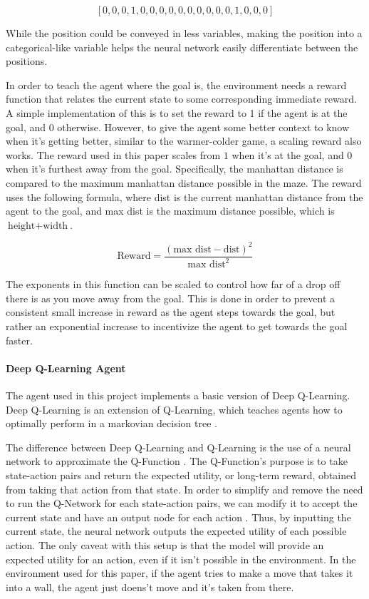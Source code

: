 \documentclass[12pt]{article}
\begin{document}
$$\left[0,0,0,1,0,0,0,0,0,0,0,0,0,0,1,0,0,0\right]$$

While the position could be conveyed in less variables, making the position into a categorical-like variable helps the neural network easily differentiate between the positions.

In order to teach the agent where the goal is, the environment needs a reward function that relates the current state to some corresponding immediate reward.
A simple implementation of this is to set the reward to 1 if the agent is at the goal, and 0 otherwise.
However, to give the agent some better context to know when it's getting better, similar to the warmer-colder game, a scaling reward also works.
The reward used in this paper scales from $1$ when it's at the goal, and $0$ when it's furthest away from the goal.
Specifically, the manhattan distance is compared to the maximum manhattan distance possible in the maze.
The reward uses the following formula, where dist is the current manhattan distance from the agent to the goal, and max dist is the maximum distance possible, which is $\text{height} + \text{width}$.

$$\text{Reward} = \frac{(\text{max dist} - \text{dist}) ^ 2}{\text{max dist}^2}$$

The exponents in this function can be scaled to control how far of a drop off there is as you move away from the goal.
This is done in order to prevent a consistent small increase in reward as the agent steps towards the goal, but rather an exponential increase to incentivize the agent to get towards the goal faster.

\paragraph{Deep Q-Learning Agent}

The agent used in this project implements a basic version of Deep Q-Learning.
Deep Q-Learning is an extension of Q-Learning, which teaches agents how to optimally perform in a markovian decision tree \cite{article_q_learning}.

The difference between Deep Q-Learning and Q-Learning is the use of a neural network to approximate the Q-Function \cite{article_human_level_control_deep_reinforcement_learning}.
The Q-Function's purpose is to take state-action pairs and return the expected utility, or long-term reward, obtained from taking that action from that state.
In order to simplify and remove the need to run the Q-Network for each state-action pairs, we can modify it to accept the current state and have an output node for each action \cite{article_reinforcement_learning_survey}.
Thus, by inputting the current state, the neural network outputs the expected utility of each possible action.
The only caveat with this setup is that the model will provide an expected utility for an action, even if it isn't possible in the environment.
In the environment used for this paper, if the agent tries to make a move that takes it into a wall, the agent just doens't move and it's taken from there.
\end{document}
